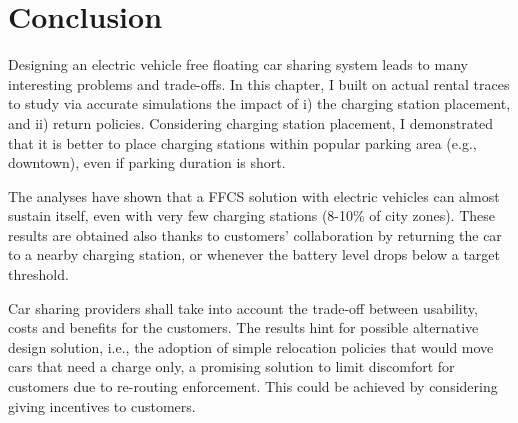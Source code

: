 \section{Conclusion}
\label{sec:6_9_conclusion}

Designing an electric vehicle free floating car sharing system leads to many interesting problems and trade-offs.
In this chapter, I built on actual rental traces to study via accurate simulations the impact of i) the charging station placement, and ii) return policies. 
Considering charging station placement, I demonstrated that it is better to place charging stations within popular parking area (e.g., downtown), even if parking duration is short.

The analyses have shown that a FFCS solution with electric vehicles can almost sustain itself, even with very few charging stations (8-10\% of city zones). These results are obtained also thanks to customers' collaboration by returning the car to a nearby charging station, or whenever the battery level drops below a target threshold.

Car sharing providers shall take into account the trade-off between usability, costs and benefits for the customers. 
The results hint for possible alternative design solution, i.e.,  the adoption of simple relocation policies that would move cars that need a charge only, a promising solution to limit discomfort for customers due to re-routing enforcement. This could be achieved by considering giving incentives to customers.

